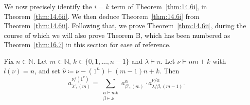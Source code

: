 \documentclass[ALCO, Unicode]{cedram}
\newcommand{\N}{\mathbb{N}}
\begin{document}
We now precisely identify the $i=k$ term of Theorem~\ref{thm:14.6i}, in Theorem~\ref{thm:14.6ii}. We then deduce Theorem~\ref{thm:14.6i} from Theorem~\ref{thm:14.6ii}. Following that, we prove Theorem~\ref{thm:14.6ii}, during the course of which we will also prove Theorem B, which has been numbered as Theorem~\ref{thm:16.7} in this section for ease of reference.

\begin{theorem}\label{thm:14.6ii}
	Fix $n\in\N$. Let $m\in\N$, $k\in\{0,1,\dotsc,n-1\}$ and $\lambda\vdash n$. Let $\nu\vdash mn+k$ with $l(\nu)=n$, and set $\hat{\nu}\coloneqq \nu-(1^n)\vdash (m-1)n+k$. Then
	\[ a^{\nu/(1^k)}_{\lambda',(m)} = \sum_{\substack{\alpha\vdash mk\\\beta\vdash k}} a^\alpha_{\beta',(m)}\cdot a^{\hat{\nu}/\alpha}_{\lambda/\beta,(m-1)}. \]
\end{theorem}
\end{document}
